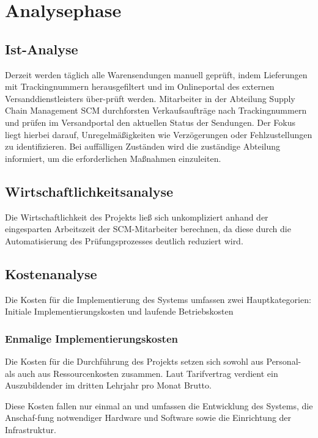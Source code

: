 \section{Analysephase} 
\label{sec:Analysephase}

\subsection{Ist-Analyse} 
\label{sec:IstAnalyse}
Derzeit werden täglich alle Warensendungen manuell geprüft, indem Lieferungen mit Trackingnummern 
herausgefiltert und im Onlineportal des externen Versanddienstleisters über-prüft werden. 
Mitarbeiter in der Abteilung Supply Chain Management \ac{SCM} durchforsten Verkaufsaufträge nach 
Trackingnummern und prüfen im Versandportal den aktuellen Status der Sendungen. Der Fokus liegt 
hierbei darauf, Unregelmäßigkeiten wie Verzögerungen oder Fehlzustellungen zu identifizieren. 
Bei auffälligen Zuständen wird die zuständige Abteilung informiert, um die erforderlichen Maßnahmen einzuleiten.

\subsection{Wirtschaftlichkeitsanalyse}
\label{sec:Wirtschaftlichkeitsanalyse}
Die Wirtschaftlichkeit des Projekts ließ sich unkompliziert anhand der eingesparten Arbeitszeit der SCM-Mitarbeiter berechnen, 
da diese durch die Automatisierung des Prüfungsprozesses deutlich reduziert wird.


\subsection{Kostenanalyse}
\label{sec:Kostenanalyse}
Die Kosten für die Implementierung des Systems umfassen zwei Hauptkategorien: 
Initiale Implementierungskosten und laufende Betriebskosten

\subsubsection{Enmalige Implementierungskosten}
\label{sec:Implementierungskosten}
Die Kosten für die Durchführung des Projekts setzen sich sowohl aus Personal- als auch aus Ressourcenkosten zusammen.
Laut Tarifvertrag verdient ein Auszubildender im dritten Lehrjahr pro Monat  Brutto. 

Diese Kosten fallen nur einmal an und umfassen die Entwicklung des Systems, 
die Anschaf-fung notwendiger Hardware und Software sowie die Einrichtung der Infrastruktur.


